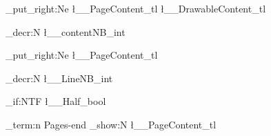 {{{{                    %
					\tl_put_right:Ne \l__PageContent_tl { \l__DrawableContent_tl}

 
                    \int_decr:N \l__contentNB_int
                    }
                    \tl_put_right:Ne \l__PageContent_tl {\EOL}
                
                \int_decr:N \l__LineNB_int
            }
            
       
        \bool_if:NTF \l__Half_bool
            {}
            {}
            
        \iow_term:n {Pages-end}
        \tl_show:N \l__PageContent_tl
  
    }       
}
\ExplSyntaxOff

